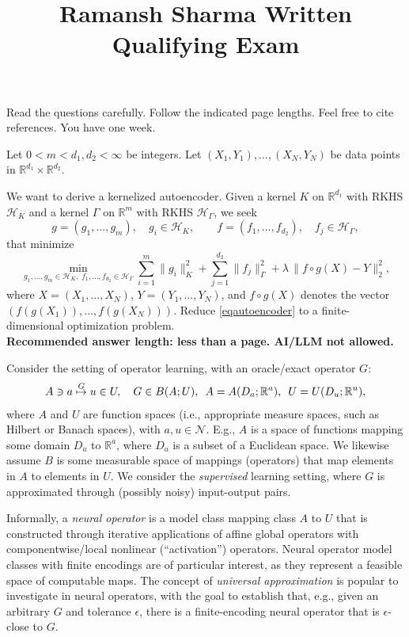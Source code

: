 \documentclass[12pt]{exam}
\def\R{\mathbb{R}}
\def\H{\mathcal{H}}
\def\N{\mathcal{N}}
\begin{document}
\title{Ramansh Sharma Written Qualifying Exam}
\date{}
\maketitle


\noindent Read the questions carefully. Follow the indicated page lengths. Feel free to cite references. You have one week. 

\begin{questions}
\question Let $0<m<d_1,d_2<\infty$ be integers.  
Let $(X_1,Y_1),\dots,(X_N,Y_N)$ be data points in $\R^{d_1}\times\R^{d_2}$.  

We want to derive a kernelized autoencoder.  
Given a kernel $K$ on $\R^{d_1}$ with RKHS $\H_K$ and a kernel $\Gamma$ on $\R^m$ with RKHS $\H_\Gamma$, we seek 
\[
  g=(g_1,\dots,g_m),\quad g_i\in \H_K, 
  \qquad 
  f=(f_1,\dots,f_{d_2}),\quad f_j\in\H_\Gamma,
\]
that minimize
\begin{equation}\label{eqautoencoder}
\min_{g_1,\ldots,g_m \in \H_K,\; f_1,\ldots,f_{d_2} \in \H_\Gamma} 
\sum_{i=1}^m \|g_i\|_K^2
+ \sum_{j=1}^{d_2}\|f_j\|_\Gamma^2
+ \lambda \,\big\| f\circ g(X)-Y\big\|_2^2,
\end{equation}
where $X=(X_1,\ldots,X_N)$, $Y=(Y_1,\ldots,Y_N)$, and $f\circ g(X)$ denotes the vector $(f(g(X_1)),\dots,f(g(X_N)))$.  
Reduce \eqref{eqautoencoder} to a finite-dimensional optimization problem.\\
{\bf Recommended answer length: less than a page. AI/LLM not allowed.}



\question Consider the setting of operator learning, with an oracle/exact operator $G$:
\begin{align*}
  A \ni a \stackrel{G}{\mapsto} u \in U, \hskip 10pt
  G \in B(A; U), \hskip 5pt A = A(D_a; \R^a), \hskip 5pt U = U(D_u; \R^u),
\end{align*}
where $A$ and $U$ are function spaces (i.e., appropriate measure spaces, such as Hilbert or Banach spaces), with $a, u \in \N$. E.g., $A$ is a space of functions mapping some domain $D_a$ to $\R^a$, where $D_a$ is a subset of a Euclidean space. We likewise assume $B$ is some measurable space of mappings (operators) that map elements in $A$ to elements in $U$. We consider the \textit{supervised} learning setting, where $G$ is approximated through (possibly noisy) input-output pairs.

Informally, a \textit{neural operator} is a model class mapping class $A$ to $U$ that is constructed through iterative applications of affine global operators with componentwise/local nonlinear (``activation'') operators. Neural operator model classes with finite encodings are of particular interest, as they represent a feasible space of computable maps. The concept of \textit{universal approximation} is popular to investigate in neural operators, with the goal to establish that, e.g., given an arbitrary $G$ and tolerance $\epsilon$, there is a finite-encoding neural operator that is $\epsilon$-close to $G$.


\end{questions}
\end{document}

